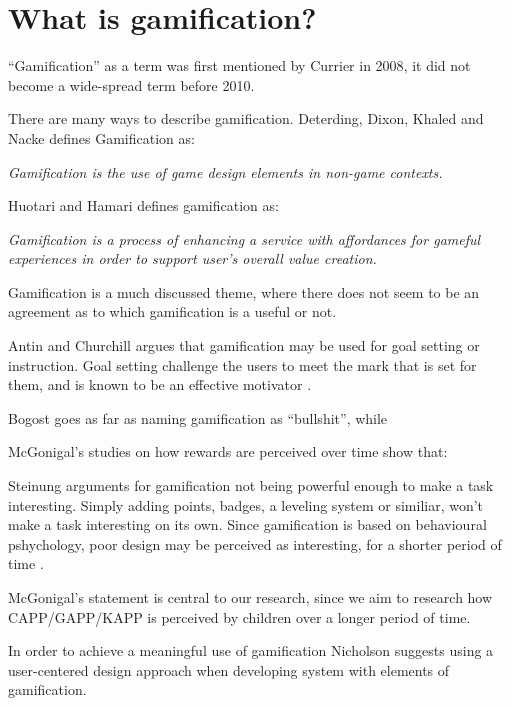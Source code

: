 \section{What is gamification?}
\label{sec:gamification}

``Gamification'' as a term was first mentioned by Currier in 2008\cite{gamificationcurrier}, it did not become a wide-spread term before 2010. 

There are many ways to describe gamification. Deterding, Dixon, Khaled and Nacke\cite{Deterding:2011:GDE:2181037.2181040} defines Gamification as:

\textit{Gamification is the use of game design elements in non-game
contexts.}

Huotari and Hamari\cite{huotari2012defining} defines gamification as:

\textit{Gamification is a process of enhancing a service with affordances for gameful experiences in order to support user's overall value creation.}


Gamification is a much discussed theme, where there does not seem to be an agreement as to which gamification is a useful or not.

Antin and Churchill\cite{antin2011badges} argues that gamification may be used for goal setting or instruction. Goal setting challenge the users to meet the mark that is set for them, and is known to be an effective motivator \cite{ling2005using}.

Bogost goes as far as naming gamification as ``bullshit''\cite{gamificationbullshit}, while 

McGonigal's studies\cite{jane2011reality} on how rewards are perceived over time show that: 


Steinung\cite{steinung2012interessante} arguments for gamification not being powerful enough to make a task interesting. Simply adding points, badges, a leveling system or similiar, won't make a task interesting on its own. Since gamification is based on behavioural pshychology, poor design may be perceived as interesting, for a shorter period of time \cite{steinung2012interessante}.

McGonigal's statement is central to our research, since we aim to research how CAPP/GAPP/KAPP is perceived  by children over a longer period of time.

In order to achieve a meaningful use of gamification Nicholson\cite{nicholson2012user} suggests using a user-centered design approach\cite{usercentereddesign} when developing system with elements of gamification. 

